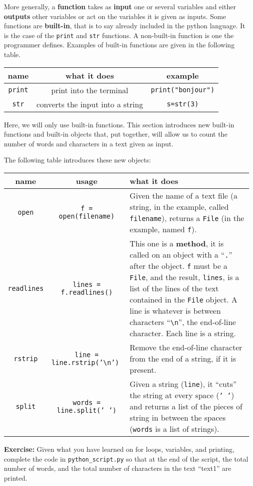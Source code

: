 \documentclass{article}
\newcommand{\exercise}[1]{
\begin{mdframed}[backgroundcolor=black!20!white]
\textbf{Exercise:} #1
\end{mdframed}
}
\begin{document}
More generally, a \textbf{function} takes as \textbf{input} one or
several variables and either \textbf{outputs} other variables or
act on the variables it is given as inputs. Some functions are
\textbf{built-in}, that is to say already included in the python language.
It is the case of the {\tt print} and {\tt str} functions. A non-built-in
function is one the programmer defines. 
Examples of built-in functions are given in the following table.
\begin{center}
    \begin{tabular}{|c|c|c|}
    \hline
    name & what it does & example \\
    \hline
        {\tt print} & print into the terminal & {\tt print("bonjour")}\\
    \hline
        {\tt str} & converts the input into a string & {\tt s=str(3)}\\
    \hline
    \end{tabular}
\end{center}

Here, we will only use built-in functions. This section introduces
new built-in functions and built-in objects that, put together,
will allow us to count the number of words and characters in a
text given as input.

The following table introduces these new objects:

\begin{center}
\begin{tabular}{|c|c|m{7cm}|}
    \hline
    name & usage & what it does \\
    \hline
    {\tt open} & {\tt f = open(filename)} & Given the name of a text file (a string, in the example, called {\tt filename}), returns a {\tt File} (in the example, named {\tt f}). \\
    \hline
    {\tt readlines} & {\tt lines = f.readlines()} & This one is a \textbf{method},
    it is called on an object with a ``{\tt .}'' after the object. {\tt f} must be
    a {\tt File}, and the result, {\tt lines}, is a list of the lines of
    the text contained in the {\tt File} object. A line is whatever
    is between characters ``{\tt \textbackslash n}'', the end-of-line
    character. Each line
    is a string.\\
    \hline
    {\tt rstrip} & {\tt line = line.rstrip('\textbackslash n') } & Remove the end-of-line character from the end of a string, if it is present. \\ 
    \hline
    {\tt split} & {\tt words = line.split(' ')} & Given a string ({\tt line}),
    it ``cuts'' the string at every space ({\tt ' '}) and returns a list
    of the pieces of string in between the spaces ({\tt words} is a list of 
    strings).\\
    \hline
\end{tabular}
\end{center}

\exercise{
Given what you have learned on for loops,  variables, and printing, complete the
code in {\tt python\_script.py} so that at the end of the script, the total
number of words, and the total number of characters in the text ``text1'' are
printed. 
}
\end{document}
